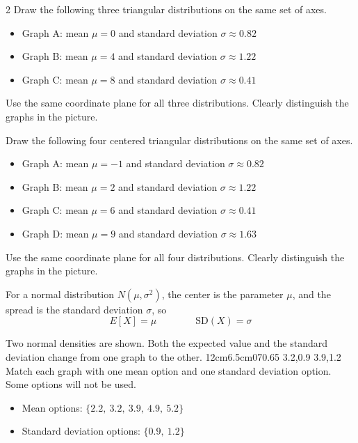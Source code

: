 \begin{multicols}{2}
\vspace{-0.25cm}
Draw the following three triangular distributions on the same set of axes.
\begin{itemize}
\item Graph A: mean $\mu=0$ and standard deviation $\sigma\approx0.82$
\item Graph B: mean $\mu=4$ and standard deviation $\sigma\approx1.22$
\item Graph C: mean $\mu=8$ and standard deviation $\sigma\approx0.41$
\end{itemize}
Use the same coordinate plane for all three distributions. Clearly distinguish the graphs in the picture.

\vspace{-0.25cm}
Draw the following four centered triangular distributions on the same set of axes.
\begin{itemize}
\item Graph A: mean $\mu=-1$ and standard deviation $\sigma\approx0.82$
\item Graph B: mean $\mu=2$ and standard deviation $\sigma\approx1.22$
\item Graph C: mean $\mu=6$ and standard deviation $\sigma\approx0.41$
\item Graph D: mean $\mu=9$ and standard deviation $\sigma\approx1.63$
\end{itemize}
Use the same coordinate plane for all four distributions. Clearly distinguish the graphs in the picture.

\vspace{-0.25cm}
For a normal distribution $N(\mu,\sigma^2)$, the center is the parameter $\mu$, and the spread is the standard deviation $\sigma$, so
\[
E[X]=\mu
\qquad \qquad
\mathrm{SD}(X)=\sigma
\]

\vspace{-0.25cm}
Two normal densities are shown. Both the expected value and the standard deviation change from one graph to the other.
\NormalTwoGraph
{12cm}{6.5cm}{0}{7}{0.65}
{3.2,0.9}
{3.9,1.2}
Match each graph with one mean option and one standard deviation option. Some options will not be used.
\begin{itemize}
\item Mean options: $\{2.2,\ 3.2,\ 3.9,\ 4.9,\ 5.2\}$
\item Standard deviation options: $\{0.9,\ 1.2\}$
\end{itemize}


\end{multicols}
